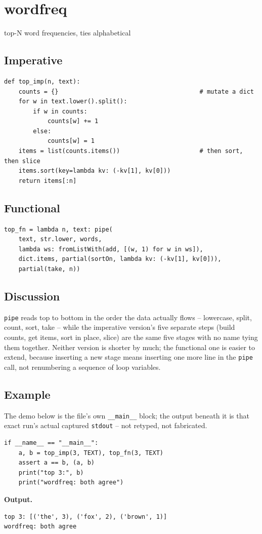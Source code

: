 \documentclass[10pt,letterpaper]{book}
\begin{document}
\chapter{wordfreq}
top-N word frequencies, ties alphabetical

\section*{Imperative}
\begin{lstlisting}[style=code]
def top_imp(n, text):
    counts = {}                                       # mutate a dict
    for w in text.lower().split():
        if w in counts:
            counts[w] += 1
        else:
            counts[w] = 1
    items = list(counts.items())                      # then sort, then slice
    items.sort(key=lambda kv: (-kv[1], kv[0]))
    return items[:n]
\end{lstlisting}
\section*{Functional}
\begin{lstlisting}[style=code]
top_fn = lambda n, text: pipe(
    text, str.lower, words,
    lambda ws: fromListWith(add, [(w, 1) for w in ws]),
    dict.items, partial(sortOn, lambda kv: (-kv[1], kv[0])),
    partial(take, n))
\end{lstlisting}
\section*{Discussion}

\texttt{pipe} reads top to bottom in the order the data actually flows --
lowercase, split, count, sort, take -- while the imperative version's
five separate steps (build counts, get items, sort in place, slice) are
the same five stages with no name tying them together. Neither version is
shorter by much; the functional one is easier to extend, because
inserting a new stage means inserting one more line in the \texttt{pipe}
call, not renumbering a sequence of loop variables.

\section*{Example}
The demo below is the file's own \texttt{\_\_main\_\_} block; the output beneath it is that exact run's actual captured \texttt{stdout} -- not retyped, not fabricated.
\begin{lstlisting}[style=code]
if __name__ == "__main__":
    a, b = top_imp(3, TEXT), top_fn(3, TEXT)
    assert a == b, (a, b)
    print("top 3:", b)
    print("wordfreq: both agree")
\end{lstlisting}
\noindent\textbf{Output.}
\begin{lstlisting}[style=ex]
top 3: [('the', 3), ('fox', 2), ('brown', 1)]
wordfreq: both agree
\end{lstlisting}
\appendix
\end{document}
